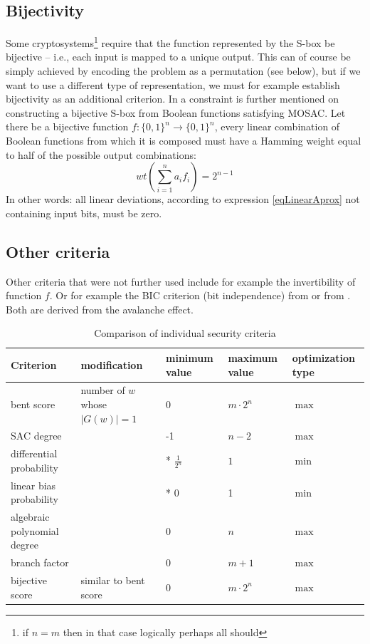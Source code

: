 \subsection{Bijectivity}
Some cryptosystems\footnote{if $n=m$ then in that case logically perhaps all should} require
that the function represented by the S-box be bijective -- i.e., each input is mapped to
a unique output.
This can of course be simply achieved by encoding the problem as a permutation (see below), but if
we want to use a different type of representation, we must for example establish bijectivity as an additional criterion.
In \cite{yokohama} a constraint is further mentioned on constructing a bijective S-box
from Boolean functions satisfying MOSAC. Let there be a bijective function
$f: \{0,1\}^n \rightarrow \{0,1\}^n$, every linear combination of Boolean functions
from which it is composed must have a Hamming weight equal to half of the possible output combinations:
\begin{equation}
  wt(\sum\limits_{i=1}^{n} a_i f_i) = 2^{n-1}
\end{equation}
In other words: all linear deviations, according to expression \ref{eqLinearAprox} not containing
input bits, must be zero.

\subsection{Other criteria}
Other criteria that were not further used include for example the invertibility of function
$f$. Or for example the BIC criterion (bit independence) from \cite{practicalSboxDesign} or
 from \cite{yokohama}.
Both are derived from the avalanche effect.


\begin{table}
  \begin{longtable}{| l | p{} | p{} | p{} | p{} |}
  \hline
  Criterion & modification & minimum value & maximum value & optimization type \\ \hline
bent score & number of $w$ whose $|G(w)| = 1$ & $0$ & $m \cdot 2^n$ & $\max$ \\ \hline
SAC degree & ~ & -1 & $n - 2$ & $\max$ \\ \hline
differential probability & ~ & * $\frac{1}{2^n}$ & $1$ & $\min$ \\ \hline
linear bias probability & ~ & * $0$ & 1 & $\min$ \\ \hline
algebraic polynomial degree & ~ & $0$ & $n$ & $\max$ \\ \hline
branch factor & ~ & 0 & $m+1$ &  $\max$ \\ \hline
 bijective score & similar to bent score & 0 & $m \cdot 2^n$ & $\max$ \\ \hline
  \end{longtable}
  \caption{Comparison of individual security criteria}
  \label{criterionComparisonTable}
\end{table}

